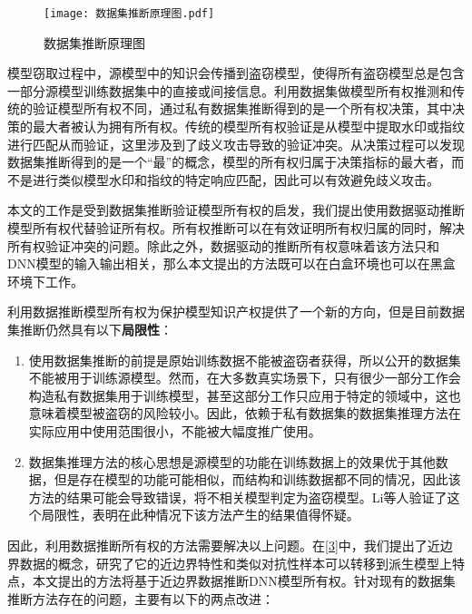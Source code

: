 \begin{figure}[htbp]%
	\centering
	\texttt{[image: 数据集推断原理图.pdf]}
	\setlength{\abovecaptionskip}{5mm} %
	\caption{数据集推断原理图}
	\label{数据集推断原理图}
	\end {figure}
	
模型窃取过程中，源模型中的知识会传播到盗窃模型，使得所有盗窃模型总是包含一部分源模型训练数据集中的直接或间接信息。利用数据集做模型所有权推测和传统的验证模型所有权不同，通过私有数据集推断得到的是一个所有权决策，其中决策的最大者被认为拥有所有权。传统的模型所有权验证是从模型中提取水印或指纹进行匹配从而验证，这里涉及到了歧义攻击导致的验证冲突。从决策过程可以发现数据集推断得到的是一个“最”的概念，模型的所有权归属于决策指标的最大者，而不是进行类似模型水印和指纹的特定响应匹配，因此可以有效避免歧义攻击。

本文的工作是受到数据集推断验证模型所有权的启发，我们提出使用数据驱动推断模型所有权代替验证所有权。所有权推断可以在有效证明所有权归属的同时，解决所有权验证冲突的问题。除此之外，数据驱动的推断所有权意味着该方法只和DNN模型的输入输出相关，那么本文提出的方法既可以在白盒环境也可以在黑盒环境下工作。

利用数据推断模型所有权为保护模型知识产权提供了一个新的方向，但是目前数据集推断仍然具有以下\textbf{局限性}：

\begin{enumerate}
	\renewcommand{\labelenumi}{\theenumi)}
	\item 使用数据集推断的前提是原始训练数据不能被盗窃者获得，所以公开的数据集不能被用于训练源模型。然而，在大多数真实场景下，只有很少一部分工作会构造私有数据集用于训练模型，甚至这部分工作只应用于特定的领域中，这也意味着模型被盗窃的风险较小。因此，依赖于私有数据集的数据集推理方法在实际应用中使用范围很小，不能被大幅度推广使用。
	\item 数据集推理方法的核心思想是源模型的功能在训练数据上的效果优于其他数据，但是存在模型的功能可能相似，而结构和训练数据都不同的情况，因此该方法的结果可能会导致错误，将不相关模型判定为盗窃模型。Li等人\cite{lao2022deepauth}验证了这个局限性，表明在此种情况下该方法产生的结果值得怀疑。
\end{enumerate}

因此，利用数据推断所有权的方法需要解决以上问题。在\ref{3}中，我们提出了近边界数据的概念，研究了它的近边界特性和类似对抗性样本可以转移到派生模型上特点，本文提出的方法将基于近边界数据推断DNN模型所有权。针对现有的数据集推断方法存在的问题，主要有以下的两点改进：

